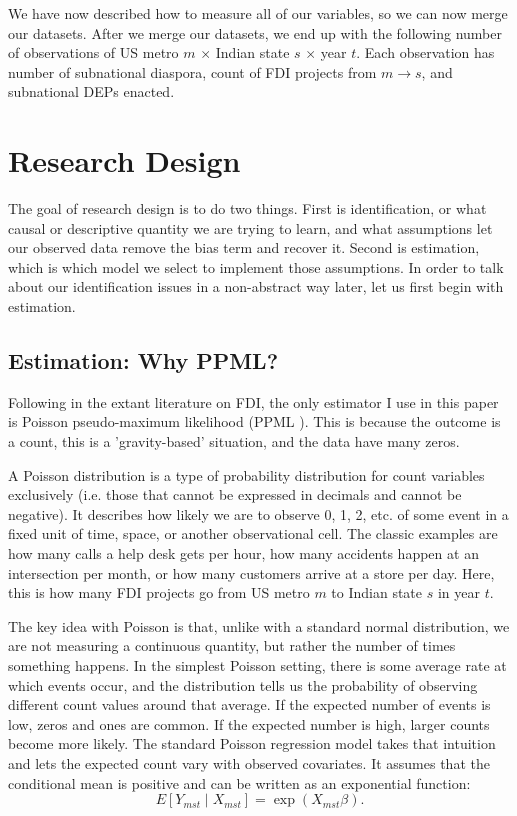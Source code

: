 \documentclass[doublespace,nopageskip]{UVAthesis}
\begin{document}
We have now described how to measure all of our variables, so we can now merge our datasets. After we merge our datasets, we end up with the following number of observations of US metro $m$ $\times$ Indian state $s$ $\times$ year $t$. Each observation has number of subnational diaspora, count of FDI projects from $m\rightarrow s$, and subnational DEPs enacted.



    \chapter{Research Design} \label{ch:research design}
    The goal of research design is to do two things. First is identification, or what causal or descriptive quantity we are trying to learn, and what assumptions let our observed data remove the bias term and recover it. Second is estimation, which is which model we select to implement those assumptions. In order to talk about our identification issues in a non-abstract way later, let us first begin with estimation.

\section{Estimation: Why PPML?} \label{ss:why_ppml}
    
   Following in the extant literature on FDI, the only estimator I use in this paper is Poisson pseudo-maximum likelihood (PPML \citep{li_repelling_2026}). This is because the outcome is a count, this is a 'gravity-based' situation, and the data have many zeros.
    
    A Poisson distribution is a type of probability distribution for count variables exclusively (i.e. those that cannot be expressed in decimals and cannot be negative). It describes how likely we are to observe 0, 1, 2, etc. of some event in a fixed unit of time, space, or another observational cell. The classic examples are how many calls a help desk gets per hour, how many accidents happen at an intersection per month, or how many customers arrive at a store per day.  Here, this is how many FDI projects go from US metro $m$ to Indian state $s$ in year $t$. 

    
    The key idea with Poisson is that, unlike with a standard normal distribution, we are not measuring a continuous quantity, but rather the number of times something happens. In the simplest Poisson setting, there is some average rate at which events occur, and the distribution tells us the probability of observing different count values around that average. If the expected number of events is low, zeros and ones are common. If the expected number is high, larger counts become more likely. The standard Poisson regression model takes that intuition and lets the expected count vary with observed covariates. It assumes that the conditional mean is positive and can be written as an exponential function:
\[
E[Y_{mst} \mid X_{mst}] = \exp(X_{mst}\beta).
\]
\end{document}
